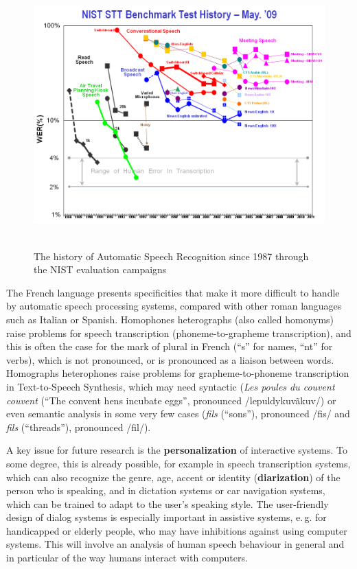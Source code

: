 \begin{multicols}{2}
\begin{figure}[!ht]
\begin{center}
  \includegraphics[height=4.0in]{_media/french/french_pix8_speech_reco_nist.png}
  \caption{The history of Automatic Speech Recognition since 1987 through the NIST evaluation campaigns~\cite{speechreconist}}
  \label{fig:nistrecoEng}
\end{center}
\end{figure}

The French language presents specificities that make it more difficult
to handle by automatic speech processing systems, compared with other
roman languages such as Italian or Spanish. Homophones heterographs
(also called homonyms) raise problems for speech transcription
(phoneme-to-grapheme transcription), and this is often the case for
the mark of plural in French (``s'' for names, ``nt'' for verbs), which is
not pronounced, or is pronounced as a liaison between
words. Homographs heterophones raise problems for grapheme-to-phoneme
transcription in Text-to-Speech Synthesis, which may need syntactic
({\em Les poules du couvent couvent} (``The convent hens incubate eggs'',
pronounced /lepuldykuvãkuv/) or even semantic analysis in some very
few cases ({\em fils} (``sons''), pronounced /fis/ and {\em fils} (``threads''),
pronounced /fil/).

A key issue for future research is the {\bf personalization} of interactive
systems. To some degree, this is already possible, for example in
speech transcription systems, which can also recognize the genre, age,
accent or identity ({\bf diarization}) of the person who is speaking, and in
dictation systems or car navigation systems, which can be trained to
adapt to the user's speaking style. The user-friendly design of dialog
systems is especially important in assistive systems, e.\,g. for
handicapped or elderly people, who may have inhibitions against using
computer systems. This will involve an analysis of human speech
behaviour in general and in particular of the way humans interact with
computers.


\end{multicols}
